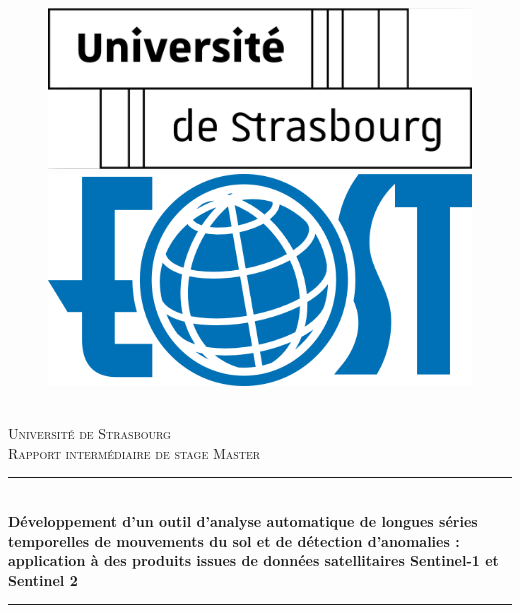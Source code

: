 \documentclass[11pt, openany]{report}
\newcommand{\HRule}{\rule{\linewidth}{0.5mm}}
\begin{document}
\begin{titlepage}
  \begin{sffamily}
  \begin{center}


\begin{figure}[h!]
  \begin{minipage}{0.48\textwidth}
   \centering
  \includegraphics[width=0.6\linewidth,left]{unistra.png}
  \end{minipage}\hfill
  \begin{minipage}{0.48\textwidth}
   \centering
  \includegraphics[width=0.6\linewidth,right]{eost.png}
  \end{minipage}
\end{figure} 


    \textsc{\LARGE \\
Université de Strasbourg}\\[3cm]

    \textsc{\Large Rapport intermédiaire de stage Master}\\[1.5cm]

    \HRule \\[0.4cm]
    { \huge \bfseries
Développement d'un outil d'analyse automatique de longues séries temporelles de mouvements du sol et de détection d'anomalies : application à des produits issues de données satellitaires Sentinel-1 et Sentinel 2 \\[0.4cm] }

\HRule \\[2cm]
	  	

\end{center}
\end{sffamily}
\end{titlepage}
\end{document}
